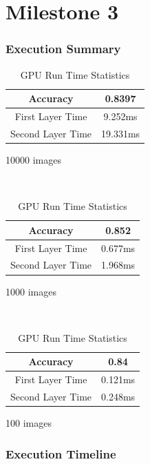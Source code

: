 \documentclass{article}
\begin{document}
\part*{Milestone 3}
\setcounter{section}{0}

\section{Execution Summary}

\begin{table}[H]
    \centering
    \begin{minipage}{.32\linewidth}
        \begin{tabular}{c|c}
            Accuracy & 0.8397 \\ \hline
            First Layer Time & 9.252ms \\ \hline
            Second Layer Time & 19.331ms
        \end{tabular}
        \caption*{10000 images}
    \end{minipage}
    ~
    \begin{minipage}{.32\linewidth}
        \begin{tabular}{c|c}
            Accuracy & 0.852 \\ \hline
            First Layer Time & 0.677ms \\ \hline
            Second Layer Time & 1.968ms
        \end{tabular}
        \caption*{1000 images}
    \end{minipage}
    ~
    \begin{minipage}{.32\linewidth}
        \begin{tabular}{c|c}
            Accuracy & 0.84 \\ \hline
            First Layer Time & 0.121ms \\ \hline
            Second Layer Time & 0.248ms
        \end{tabular}
        \caption*{100 images}
    \end{minipage}
    \caption{GPU Run Time Statistics}
\end{table}

\section{Execution Timeline}
\end{document}
